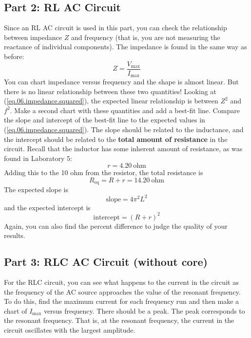 \subsection{Part 2: RL AC Circuit}
%
Since an RL AC circuit is used in this part, you can check the relationship between impedance $Z$ and frequency (that is, you are not measuring the reactance of individual components). The impedance is found in the same way as before:
\begin{equation}
	Z = \frac{V_{\text{max}}}{I_{\text{max}}}
\end{equation}
You can chart impedance versus frequency and the shape is almost linear. But there is no linear relationship between these two quantities! Looking at (\ref{eq.06.impedance.squared}), the expected linear relationship is between $Z^{2}$ and $f^{2}$. Make a second chart with these quantities and add a best-fit line. Compare the slope and intercept of the best-fit line to the expected values in (\ref{eq.06.impedance.squared}). The slope should be related to the inductance, and the intercept should be related to the \textbf{total amount of resistance} in the circuit. Recall that the inductor has some inherent amount of resistance, as was found in Laboratory 5:
\begin{equation}
	r = 4.20 \ \text{ohm}
\end{equation}
Adding this to the 10 ohm from the resistor, the total resistance is
\begin{equation}
	R_{\text{eq}} = R + r = 14.20 \ \text{ohm}
\end{equation}
The expected slope is
\begin{equation}
	\text{slope} = 4 \pi^{2} L^{2}
\end{equation}
and the expected intercept is
\begin{equation}
	\text{intercept} = (R + r)^{2}
\end{equation}
Again, you can also find the percent difference to judge the quality of your results.
%
\subsection{Part 3: RLC AC Circuit (without core)}
%
For the RLC circuit, you can see what happens to the current in the circuit as the frequency of the AC source  approaches the value of the resonant frequency. To do this, find the maximum current for each frequency run and then make a chart of $I_{\text{max}}$ versus frequency. There should be a peak. The peak corresponds to the resonant frequency. That is, at the resonant frequency, the current in the circuit oscillates with the largest amplitude.

